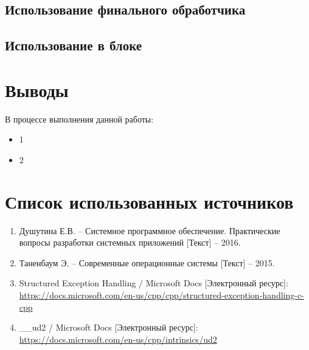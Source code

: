 
\subsection{Использование финального обработчика }


\subsection{Использование  в блоке }


\newpage

\section{Выводы}

В процессе выполнения данной работы:

\begin{itemize}
	\item 1
	\item 2
\end{itemize}

\section*{Список использованных источников}

\begin{enumerate}
	\item Душутина Е.В. -- Системное программное обеспечение. Практические вопросы разработки системных приложений [Текст] -- 2016.
	\item Таненбаум Э. -- Современные операционные системы [Текст] -- 2015.
	\item Structured Exception Handling / Microsoft Docs [Электронный ресурс]:\\
		{\small\url{https://docs.microsoft.com/en-us/cpp/cpp/structured-exception-handling-c-cpp}}
	\item \_\_ud2 / Microsoft Docs [Электронный ресурс]:\\
		{\small\url{https://docs.microsoft.com/en-us/cpp/intrinsics/ud2}}
\end{enumerate}


